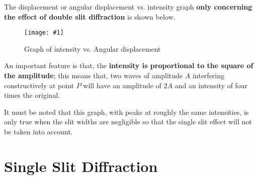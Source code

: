 \documentclass[a4paper,12pt]{article}
\let\oldsection\section
\renewcommand\section{\clearpage\oldsection}
\newcommand{\img}[4]{\begin{center}
  \begin{figure}[H]
    \centering
    \texttt{[image: \#1]}
    \caption{#3}
    \label{fig:#4}
  \end{figure}
\end{center}}
\begin{document}
The displacement or angular displacement vs. intensity graph \textbf{only concerning the effect of double slit diffraction} is shown below.
\img{doubleslitgraph.png}{0.5}{Graph of intensity vs. Angular displacement}{doubleslitgraph}
An important feature is that, the \textbf{intensity is proportional to the square of the amplitude}; this means that, two waves of amplitude $A$ interfering constructively at point $P$ will have an amplitude of $2A$ and an intensity of four times the original.
\begin{ass}{}
  It must be noted that this graph, with peaks at roughly the same intensities, is only true when the slit widths are negligible so that the single slit effect will not be taken into account.
\end{ass}

\section{Single Slit Diffraction}
\end{document}
